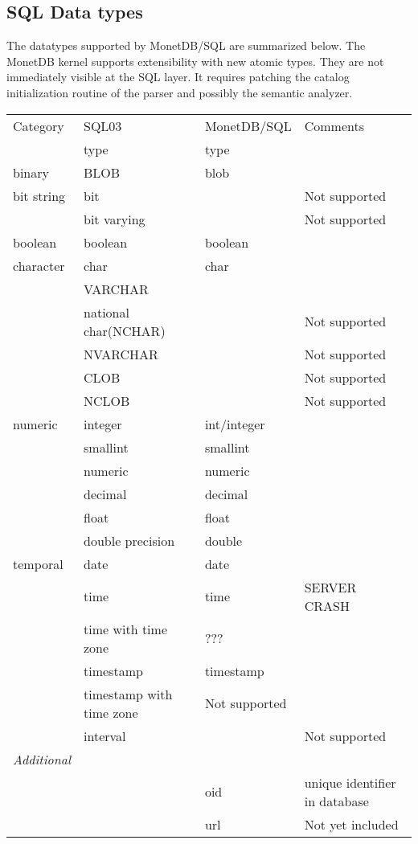 \documentclass[10pt,twocolumn,fleqn]{article}
\begin{document}
\subsection{SQL Data types}
The datatypes supported by MonetDB/SQL are summarized below.
The MonetDB kernel supports extensibility with new atomic types.
They are not immediately visible at the SQL layer. It requires
patching the catalog initialization routine of the parser
and possibly the semantic analyzer.

\begin{tabular}{l |l | l | l}
Category	& SQL03 & MonetDB/SQL & Comments\\
		& type	& type	&	\\\hline
binary		& BLOB	& blob	& 	\\
bit string	& bit	&	&	Not supported\\
		& bit varying&	&	Not supported\\
boolean		& boolean& boolean&		\\
character	& char	& char	&	\\
		& VARCHAR &	&	\\
		& national char(NCHAR)&& Not supported\\
		& NVARCHAR&	& 	Not supported\\
		& CLOB	&	&	Not supported\\
		& NCLOB	&	&	Not supported\\
numeric		& integer& int/integer &\\
		& smallint&smallint&	\\
		&numeric &numeric&	\\
		& decimal&decimal&	 \\
		& float & float&	\\
		& double precision& double&	\\
temporal	& date & date&	\\
		& time & time& SERVER CRASH	\\
		& time with time zone& ???\\
		& timestamp& timestamp&	\\
		& timestamp with time zone& Not supported\\
		& interval &	& Not supported\\\hline
{\em Additional}&	&	&	\\
		&	& oid	& unique identifier in database\\
		&	& url	& Not yet included\\
\end{tabular}
\end{document}

